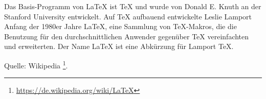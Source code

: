 
\noindent Das Basis-Programm von LaTeX ist TeX und wurde von Donald E. Knuth an der Stanford University entwickelt. 
Auf TeX aufbauend entwickelte Leslie Lamport Anfang der 1980er Jahre LaTeX, eine Sammlung von TeX-Makros, 
die die Benutzung für den durchschnittlichen Anwender gegenüber TeX vereinfachten und erweiterten. 
Der Name LaTeX ist eine Abkürzung für Lamport TeX.

\hfill Quelle: Wikipedia \footnote{\url{https://de.wikipedia.org/wiki/LaTeX}}.  	
 	

